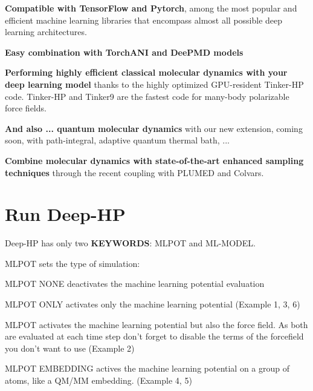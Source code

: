 \begin{DoxyItemize}
\item {\bfseries Compatible with Tensor\-Flow and Pytorch}, among the most popular and efficient machine learning libraries that encompass almost all possible deep learning architectures.
\item {\bfseries Easy combination with Torch\-A\-N\-I and Dee\-P\-M\-D models}
\item {\bfseries Performing highly efficient classical molecular dynamics with your deep learning model} thanks to the highly optimized G\-P\-U-\/resident Tinker-\/\-H\-P code. Tinker-\/\-H\-P and Tinker9 are the fastest code for many-\/body polarizable force fields.
\item {\bfseries And also ... quantum molecular dynamics} with our new extension, coming soon, with path-\/integral, adaptive quantum thermal bath, ...
\item {\bfseries Combine molecular dynamics with state-\/of-\/the-\/art enhanced sampling techniques} through the recent coupling with P\-L\-U\-M\-E\-D and Colvars.
\end{DoxyItemize}

\section*{Run Deep-\/\-H\-P}

Deep-\/\-H\-P has only two {\bfseries K\-E\-Y\-W\-O\-R\-D\-S}\-: {\ttfamily M\-L\-P\-O\-T} and {\ttfamily M\-L-\/\-M\-O\-D\-E\-L}.

{\ttfamily M\-L\-P\-O\-T} sets the type of simulation\-:
\begin{DoxyItemize}
\item {\ttfamily M\-L\-P\-O\-T N\-O\-N\-E} deactivates the machine learning potential evaluation
\item {\ttfamily M\-L\-P\-O\-T O\-N\-L\-Y} activates only the machine learning potential (Example 1, 3, 6)
\item {\ttfamily M\-L\-P\-O\-T} activates the machine learning potential but also the force field. As both are evaluated at each time step don't forget to disable the terms of the forcefield you don't want to use (Example 2)
\item {\ttfamily M\-L\-P\-O\-T E\-M\-B\-E\-D\-D\-I\-N\-G} actives the machine learning potential on a group of atoms, like a Q\-M/\-M\-M embedding. (Example 4, 5)
\end{DoxyItemize}


